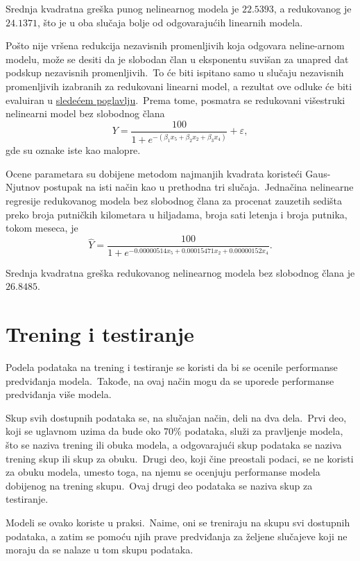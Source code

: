 \documentclass[12pt,a4paper,titlepage,oneside]{article}
\numberwithin{equation}{section}
\numberwithin{figure}{section}
\numberwithin{table}{section}
\theoremstyle{definition}
\theoremstyle{remark}
\begin{document}
Srednja kvadratna greška punog nelinearnog modela je $22.5393$, a redukovanog je $24.1371$, što je u oba slučaja bolje od odgovarajućih linearnih modela.

Pošto nije vršena redukcija nezavisnih promenljivih koja odgovara neline-arnom modelu, može se desiti da je slobodan član u eksponentu suvišan za unapred dat podskup nezavisnih promenljivih.\ To će biti ispitano samo u slučaju nezavisnih promenljivih izabranih za redukovani linearni model, a rezultat ove odluke će biti evaluiran u \hyperref[Trening i testiranje]{sledećem poglavlju}.\ Prema tome, posmatra se redukovani višestruki nelinearni model bez slobodnog člana \[Y = \dfrac{100}{1 + e^{-(\beta_1 x_5 + \beta_2 x_2 + \beta_3 x_4)}} + \varepsilon ,\] gde su oznake iste kao malopre.

Ocene parametara su dobijene metodom najmanjih kvadrata koristeći Gaus-Njutnov postupak na isti način kao u prethodna tri slučaja.\ Jednačina nelinearne regresije redukovanog modela bez slobodnog člana za procenat zauzetih sedišta preko broja putničkih kilometara u hiljadama, broja sati letenja i broja putnika, tokom meseca, je \[\hat{Y} = \dfrac{100}{1 + e^{-0.00000514 x_5 + 0.00015471 x_2 + 0.00000152 x_4}}.\]

Srednja kvadratna greška redukovanog nelinearnog modela bez slobodnog člana je $26.8485$.

\newpage

\thispagestyle{empty}

\section{Trening i testiranje}\label{Trening i testiranje}

\setcounter{footnote}{0}

Podela podataka na trening i testiranje se koristi da bi se ocenile performanse predviđanja modela.\ Takođe, na ovaj način mogu da se uporede performanse predviđanja više modela.

Skup svih dostupnih podataka se, na slučajan način, deli na dva dela.\ Prvi deo, koji se uglavnom uzima da bude oko $70\%$ podataka, služi za pravljenje modela, što se naziva trening ili obuka modela, a odgovarajući skup podataka se naziva trening skup ili skup za obuku.\ Drugi deo, koji čine preostali podaci, se ne koristi za obuku modela, umesto toga, na njemu se ocenjuju performanse modela dobijenog na trening skupu.\ Ovaj drugi deo podataka se naziva skup za testiranje.

Modeli se ovako koriste u praksi.\ Naime, oni se treniraju na skupu svi dostupnih podataka, a zatim se pomoću njih prave predviđanja za željene slučajeve koji ne moraju da se nalaze u tom skupu podataka.
\end{document}
